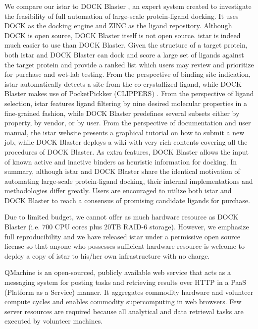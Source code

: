 We compare our istar to DOCK Blaster \citep{557}, an expert system created to investigate the feasibility of full automation of large-scale protein-ligand docking. It uses DOCK \citep{1222} as the docking engine and ZINC \citep{532,1178} as the ligand repository. Although DOCK is open source, DOCK Blaster itself is not open source. istar is indeed much easier to use than DOCK Blaster. Given the structure of a target protein, both istar and DOCK Blaster can dock and score a large set of ligands against the target protein and provide a ranked list which users may review and prioritize for purchase and wet-lab testing. From the perspective of binding site indication, istar automatically detects a site from the co-crystallized ligand, while DOCK Blaster makes use of PocketPickker (CLIPPERS) \citep{395}. From the perspective of ligand selection, istar features ligand filtering by nine desired molecular properties in a fine-grained fashion, while DOCK Blaster predefines several subsets either by property, by vendor, or by user. From the perspective of documentation and user manual, the istar website presents a graphical tutorial on how to submit a new job, while DOCK Blaster deploys a wiki with very rich contents covering all the procedures of DOCK Blaster. As extra features, DOCK Blaster allows the input of known active and inactive binders as heuristic information for docking. In summary, although istar and DOCK Blaster share the identical motivation of automating large-scale protein-ligand docking, their internal implementations and methodologies differ greatly. Users are encouraged to utilize both istar and DOCK Blaster to reach a consensus of promising candidate ligands for purchase.

Due to limited budget, we cannot offer as much hardware resource as DOCK Blaster (i.e. 700 CPU cores plus 20TB RAID-6 storage). However, we emphasize full reproducibility and we have released istar under a permissive open source license so that anyone who possesses sufficient hardware resource is welcome to deploy a copy of istar to his/her own infrastructure with no charge.

QMachine \citep{1405} is an open-sourced, publicly available web service that acts as a messaging system for posting tasks and
retrieving results over HTTP in a PaaS (Platform as a Service) manner. It aggregates commodity hardware and volunteer compute cycles and enables commodity supercomputing in web browsers. Few server resources are required because all analytical and data retrieval tasks are executed by volunteer machines.

